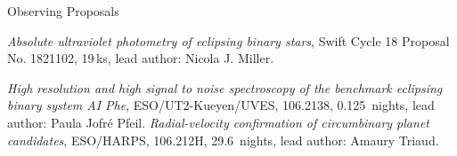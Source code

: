 \begin{rubric}{Observing Proposals}

\entry*[2022]
    \textit{Absolute ultraviolet photometry of eclipsing binary stars}, Swift Cycle 18 Proposal No. 1821102, 19\,ks, lead author: Nicola J. Miller.

\entry*[2020]
    \textit{High resolution and high signal to noise spectroscopy of the benchmark eclipsing binary system AI Phe}, ESO/UT2-Kueyen/UVES, 106.2138, 0.125~nights, lead author: Paula Jofr\'{e} Pfeil.
\entry*[2020]
    \textit{Radial-velocity confirmation of circumbinary planet candidates}, ESO/HARPS, 106.212H, 29.6~nights, lead author: Amaury Triaud.
    
\end{rubric}